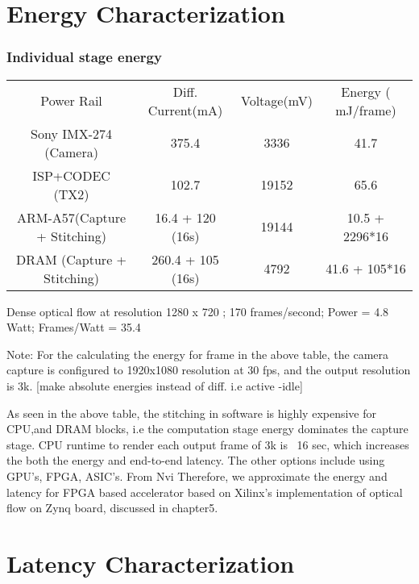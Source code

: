 \section{Energy Characterization}
\subsubsection{Individual stage energy}

	\begin{tabular}{c|c|c|c}
	Power Rail & Diff. Current(mA) & Voltage(mV) & Energy ( mJ/frame) \\
	Sony IMX-274 (Camera) & 375.4 & 3336 & 41.7 \\
	ISP+CODEC (TX2) & 102.7 & 19152 & 65.6 \\
	ARM-A57(Capture + Stitching) & 16.4 + 120 (16s) & 19144 & 10.5 + 2296*16\\
	DRAM (Capture + Stitching)  & 260.4 + 105 (16s)  & 4792 & 41.6 + 105*16 \\
	\end{tabular} \newline \newline
Dense optical flow at resolution 1280 x 720 ; 170 frames/second; Power = 4.8 Watt; Frames/Watt = 35.4

	Note: For the calculating the energy for frame in the above table, the camera capture is configured to 1920x1080 resolution at 30 fps, and the output resolution is 3k. [make absolute energies instead of diff. i.e active -idle]\newline
	
	As seen in the above table, the stitching in software is highly expensive for CPU,and DRAM blocks, i.e the computation stage energy dominates the capture stage. CPU runtime to render each output frame of 3k is ~16 sec, which increases the both the energy and end-to-end latency. The other options include using GPU's, FPGA, ASIC's. From Nvi   Therefore, we approximate the energy and latency for FPGA based accelerator based on Xilinx's implementation of optical flow on Zynq board, discussed in chapter5.\newline

\section{Latency Characterization}

